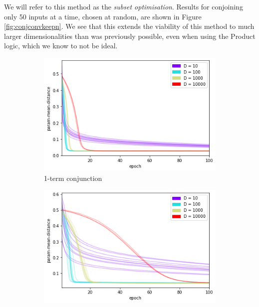 We will refer to this method as the \textit{subset optimisation}. Results for conjoining only 50 inputs at a time, chosen at random, are shown in Figure \ref{fig:conjconvkeepn}. We see that this extends the viability of this method to much larger dimensionalities than was previously possible, even when using the Product logic, which we know to not be ideal.

\begin{figure}[h]
    \centering
    \begin{subfigure}[b]{0.30\textwidth}
        \centering
        \includegraphics[width=\textwidth]{imgs/conj-pmd-prod-keep50-1t.png}
        \caption{1-term conjunction}
        \label{fig:conjconvkeepn1}
    \end{subfigure}
    \begin{subfigure}[b]{0.30\textwidth}
        \centering
        \includegraphics[width=\textwidth]{imgs/conj-pmd-prod-keep50-5t.png}

\end{subfigure}
\end{figure}

